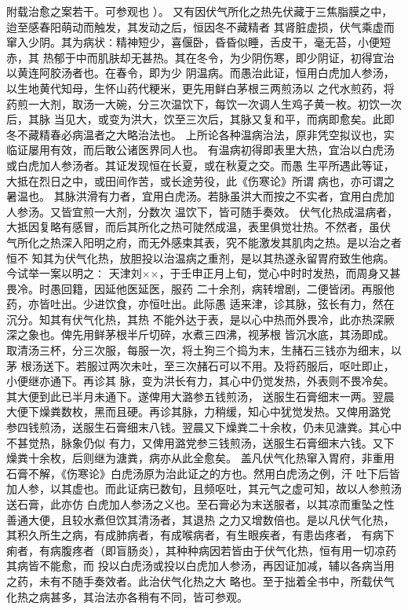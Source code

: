 \documentclass[a4paper,12pt,UTF8,twoside]{ctexbook}
\begin{document}
附载治愈之案若干。可参观也 ）。 
又有因伏气所化之热先伏藏于三焦脂膜之中，迨至感春阳萌动而触发，其发动之后，恒因冬不藏精者 
其肾脏虚损，伏气乘虚而窜入少阴。其为病状∶精神短少，喜偃卧，昏昏似睡，舌皮干，毫无苔，小便短赤，其 
热郁于中而肌肤却无甚热。其在冬令，为少阴伤寒，即少阴证，初得宜治以黄连阿胶汤者也。在春令，即为少 
阴温病。而愚治此证，恒用白虎加人参汤，以生地黄代知母，生怀山药代粳米，更先用鲜白茅根三两煎汤以 
之代水煎药，将药煎一大剂，取汤一大碗，分三次温饮下，每饮一次调人生鸡子黄一枚。初饮一次后，其脉 
当见大，或变为洪大，饮至三次后，其脉又复和平，而病即愈矣。此即冬不藏精春必病温者之大略治法也。 
上所论各种温病治法，原非凭空拟议也，实临证屡用有效，而后敢公诸医界同人也。 
有温病初得即表里大热，宜治以白虎汤或白虎加人参汤者。其证发现恒在长夏，或在秋夏之交。而愚 
生平所遇此等证，大抵在烈日之中，或田间作苦，或长途劳役，此《伤寒论》所谓 病也，亦可谓之暑温也。 
其脉洪滑有力者，宜用白虎汤。若脉虽洪大而按之不实者，宜用白虎加人参汤。又皆宜煎一大剂，分数次 
温饮下，皆可随手奏效。 
伏气化热成温病者，大抵因复略有感冒，而后其所化之热可陡然成温，表里俱觉壮热。不然者，虽伏 
气所化之热深入阳明之府，而无外感束其表，究不能激发其肌肉之热。是以治之者恒不 
知其为伏气化热，放胆投以治温病之重剂，是以其热遂永留胃府致生他病。今试举一案以明之∶ 
天津刘××，于壬申正月上旬，觉心中时时发热，而周身又甚畏冷。时愚回籍，因延他医延医，服药 
二十余剂，病转增剧，二便皆闭。再服他药，亦皆吐出。少进饮食，亦恒吐出。此际愚 
适来津，诊其脉，弦长有力，然在沉分。知其有伏气化热，其热 
不能外达于表，是以心中热而外畏冷，此亦热深厥深之象也。俾先用鲜茅根半斤切碎，水煮三四沸，视茅根 
皆沉水底，其汤即成。取清汤三杯，分三次服，每服一次，将土狗三个捣为末，生赭石三钱亦为细末，以茅 
根汤送下。若服过两次未吐，至三次赭石可以不用。及将药服后，呕吐即止，小便继亦通下。再诊其 
脉，变为洪长有力，其心中仍觉发热，外表则不畏冷矣。其大便到此已半月未通下。遂俾用大潞参五钱煎汤， 
送服生石膏细末一两。翌晨大便下燥粪数枚，黑而且硬。再诊其脉，力稍缓，知心中犹觉发热。又俾用潞党 
参四钱煎汤，送服生石膏细末八钱。翌晨又下燥粪二十余枚，仍未见溏粪。其心中不甚觉热，脉象仍似 
有力，又俾用潞党参三钱煎汤，送服生石膏细末六钱。又下燥粪十余枚，后则继为溏粪，病亦从此全愈矣。 
盖凡伏气化热窜入胃府，非重用石膏不解，《伤寒论》白虎汤原为治此证之的方也。然用白虎汤之例，汗 
吐下后皆加人参，以其虚也。而此证病已数旬，且频呕吐，其元气之虚可知，故以人参煎汤送石膏，此亦仿 
白虎加人参汤之义也。至石膏必为末送服者，以其凉而重坠之性善通大便，且较水煮但饮其清汤者，其退热 
之力又增数倍也。是以凡伏气化热，其积久所生之病，有成肺病者，有成喉病者，有生眼疾者，有患齿疼者， 
有病下痢者，有病腹疼者（即盲肠炎），其种种病因若皆由于伏气化热，恒有用一切凉药其病皆不能愈，而 
投以白虎汤或投以白虎加人参汤，再因证加减，辅以各病当用之药，未有不随手奏效者。此治伏气化热之大 
略也。至于拙着全书中，所载伏气化热之病甚多，其治法亦各稍有不同，皆可参观。 
\end{document}
